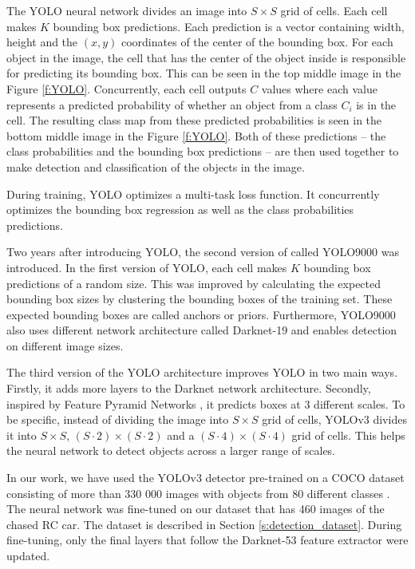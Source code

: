 \documentclass{ctuthesis/ctuthesis}
\begin{document}
The YOLO neural network divides an image into $S\times S$ grid of cells. Each cell makes $K$ bounding box predictions. Each prediction is a vector containing width, height and the $(x,y)$ coordinates of the center of the bounding box. For each object in the image, the cell that has the center of the object inside is responsible for predicting its bounding box. This can be seen in the top middle image in the Figure \ref{f:YOLO}. Concurrently, each cell outputs $C$ values where each value represents a predicted probability of whether an object from a class $C_i$ is in the cell. The resulting class map from these predicted probabilities is seen in the bottom middle image in the Figure \ref{f:YOLO}. Both of these predictions -- the class probabilities and the bounding box predictions -- are then used together to make detection and classification of the objects in the image.
\par

During training, YOLO optimizes a multi-task loss function. It concurrently optimizes the bounding box regression as well as the class probabilities predictions.


Two years after introducing YOLO, the second version of called YOLO9000 \cite{YOLO9000} was introduced. In the first version of YOLO, each cell makes $K$ bounding box predictions of a random size. This was improved by calculating the expected bounding box sizes by clustering the bounding boxes of the training set. These expected bounding boxes are called anchors or priors. Furthermore, YOLO9000 also uses different network architecture called Darknet-19 and enables detection on different image sizes. \par


The third version of the YOLO architecture \cite{YOLOv3} improves YOLO in two main ways. Firstly, it adds more layers to the Darknet network architecture. Secondly, inspired by Feature Pyramid Networks \cite{FPN}, it predicts boxes at 3 different scales. To be specific, instead of dividing the image into $S\times S$ grid of cells, YOLOv3 divides it into $S\times S$, $(S\cdot2)\times (S\cdot2)$ and a $(S\cdot4)\times (S\cdot4)$ grid of cells. This helps the neural network to detect objects across a larger range of scales.


In our work, we have used the YOLOv3 detector pre-trained on a COCO dataset consisting of more than 330 000 images with objects from 80 different classes \cite{COCO_dataset}. The neural network was fine-tuned on our dataset that has 460 images of the chased RC car. The dataset is described in Section \ref{s:detection_dataset}. During fine-tuning, only the final layers that follow the Darknet-53 feature extractor were updated.
\end{document}
